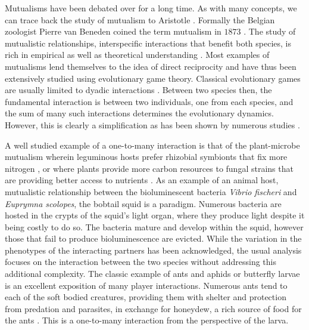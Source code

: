 \documentclass[12pt]{article}
\begin{document}
Mutualisms have been debated over for a long time.
As with many concepts, we can trace back the study of mutualism to Aristotle \citep{aristotle:book:350}.
Formally the Belgian zoologist Pierre van Beneden coined the term mutualism in $1873$ \citep{bronstein:book:2003}.
The study of mutualistic relationships, interspecific interactions that benefit both species, is rich in empirical as well as theoretical understanding 
\citep{boucher:book:1985,hinton:PTENHS:1951,wilson:AmNat:1983,bronstein:QRB:1994,pierce:ARE:2002,kiers:Nature:2003,bshary:ASB:2004} \citep{poulin:JTB:1995,doebeli:PNAS:1998,noe:book:2001,johnstone:ECL:2002,bergstrom:PNAS:2003,hoeksema:AmNat:2003,akcay:PRSB:2007,bshary:Nature:2008}.
Most examples of mutualisms lend themselves to the idea of direct reciprocity \citep{trivers:QRB:1971} and have thus been extensively studied using evolutionary game theory.
Classical evolutionary games are usually limited to dyadic interactions \citep{weibull:book:1995,hofbauer:JMB:1996,hofbauer:book:1998}.
Between two species then, the fundamental interaction is between two individuals, one from each species, and the sum of many such interactions determines the evolutionary dynamics.
However, this is clearly a simplification as has been shown by numerous studies \citep{noe:TREE:1995,noe:book:2001,kiers:Nature:2003,stanton:AmNat:2003,stadler:book:2008}.

A well studied example of a one-to-many interaction is that of the plant-microbe mutualism wherein leguminous hosts prefer rhizobial symbionts that fix more nitrogen \citep{kiers:Nature:2003}, or where plants provide more carbon resources to fungal strains that are providing better access to nutrients \citep{kiers:Science:2011}.
As an example of an animal host, mutualistic relationship between the bioluminescent bacteria \textit{Vibrio fischeri} and \textit{Euprymna scolopes}, the bobtail squid \citep{mcfallngai:PLoSB:2014} is a paradigm. 
Numerous bacteria are hosted in the crypts of the squid's light organ, where they produce light despite it being costly to do so. 
The bacteria mature and develop within the squid, however those that fail to produce bioluminescence are evicted. 
While the variation in the phenotypes of the interacting partners has been acknowledged, the usual analysis focuses on the interaction between the two species without addressing this additional complexity.
The classic example of ants and aphids or butterfly larvae \citep{pierce:BES:1987,hoelldobler:book:1990} is an excellent exposition of many player interactions. Numerous ants tend to each of the soft bodied creatures, providing them with shelter and protection from predation and parasites, in exchange for honeydew, a rich source of food for the ants \citep{hill:OEC:1989,stadler:book:2008}.
This is a one-to-many interaction from the perspective of the larva.
\end{document}
